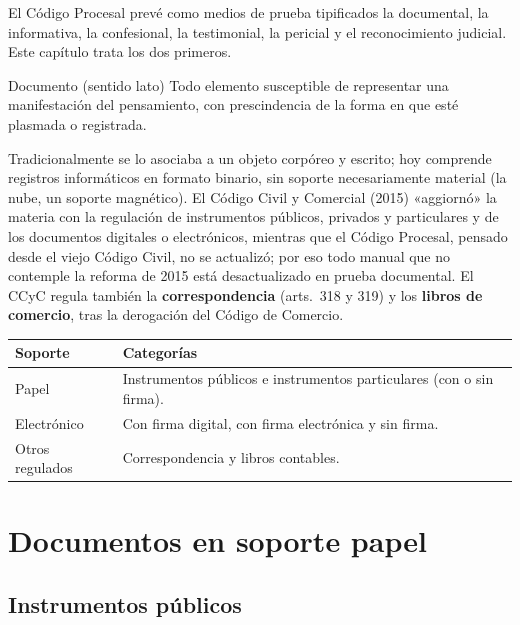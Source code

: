 \documentclass[12pt,oneside]{book}
\renewcommand{\arraystretch}{1.15}
\begin{document}
El Código Procesal prevé como medios de prueba tipificados la documental, la informativa, la confesional, la testimonial, la pericial y el reconocimiento judicial. Este capítulo trata los dos primeros.

\begin{definicion}{Documento (sentido lato)}
Todo elemento susceptible de representar una manifestación del pensamiento, con prescindencia de la forma en que esté plasmada o registrada.
\end{definicion}

Tradicionalmente se lo asociaba a un objeto corpóreo y escrito; hoy comprende registros informáticos en formato binario, sin soporte necesariamente material (la nube, un soporte magnético). El Código Civil y Comercial (2015) «aggiornó» la materia con la regulación de instrumentos públicos, privados y particulares y de los documentos digitales o electrónicos, mientras que el Código Procesal, pensado desde el viejo Código Civil, no se actualizó; por eso todo manual que no contemple la reforma de 2015 está desactualizado en prueba documental. El CCyC regula también la \textbf{correspondencia} (arts.~318 y 319) y los \textbf{libros de comercio}, tras la derogación del Código de Comercio.

\begin{table}[H]
\centering
\renewcommand{\arraystretch}{1.25}
\begin{tabularx}{\textwidth}{>{\RaggedRight\arraybackslash}p{}>{\RaggedRight\arraybackslash}X}
\toprule
\textbf{Soporte} & \textbf{Categorías} \\
\midrule
Papel & Instrumentos públicos e instrumentos particulares (con o sin firma). \\
Electrónico & Con firma digital, con firma electrónica y sin firma. \\
Otros regulados & Correspondencia y libros contables. \\
\bottomrule
\end{tabularx}
\end{table}

\section{Documentos en soporte papel}

\subsection{Instrumentos públicos}
\end{document}
